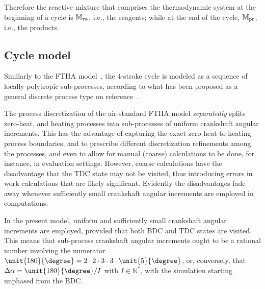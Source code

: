     Therefore the reactive mixture that comprises the thermodynamic system at the beginning of a cycle is $\mathbb{M}_{\mbox{\scriptsize\tt re}}$, i.e., the reagents; while at the end  of  the  cycle,  $\mathbb{M}_{\mbox{\scriptsize\tt pr}}$,  i.e.,  the
    products.


    \subsection{Cycle model}\label{sec:model.cyclem}

    Similarly to the FTHA model~\cite{2017-NaaktgeborenC-IntJMechEngEduc}, the 4-stroke cycle is modeled as a sequence of locally polytropic sub-processes, according to what has been  proposed
    as a general discrete process type on reference~\cite{2020-NaaktgeborenC-Polytropic-engrXiv-rev02}.

    The process discretization of the air-standard FTHA model \emph{separatedly} splits zero-heat, and heating processes into sub-processes of uniform crankshaft angular increments.  This  has
    the advantage of capturing the exact zero-heat to heating process boundaries, and to prescribe different discretization refinements among the  processes,  and  even  to  allow  for  manual
    (coarse) calculations to be done, for instance, in evaluation settings. However, coarse calculations have the disadvantage that the TDC state may not be visited, thus introducing errors in
    work calculations that are likely significant. Evidently the disadvantages fade away whenever sufficiently small crankshaft angular increments are employed in computations.

    In the present model, uniform and sufficiently small crankshaft angular increments are employed, provided that both BDC and TDC states are visited. This means that  sub-process  crankshaft
    angular increments ought to be a rational number involving the numerator $\unit{180}{\degree} = 2 \cdot 2 \cdot 3 \cdot 3 \cdot \unit{5}{\degree}$, or,  conversely,  that  $\Delta\alpha  =
    \unit{180}{\degree} / I$ with $I \in \mathbb{N}^*$, with the simulation starting unphased from the BDC.

